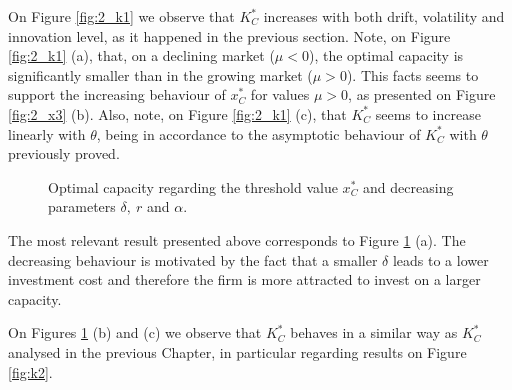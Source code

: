 On Figure \ref{fig:2_k1} we observe that $K^*_C$ increases with both drift, volatility and innovation level, as it happened in the previous section. 
Note, on Figure \ref{fig:2_k1} (a), that, on a declining market ($\mu<0$), the optimal capacity is significantly smaller than in the growing market ($\mu>0$). This facts seems to support the increasing behaviour of $x^*_C$ for values $\mu>0$, as presented on Figure \ref{fig:2_x3} (b).
Also, note, on Figure \ref{fig:2_k1} (c), that $K^*_C$ seems to increase linearly with $\theta$, being in accordance to the asymptotic behaviour of $K_C^*$ with $\theta$ previously proved.

\begin{figure}[!htb]
	\begin{subfigmatrix}{3}
	\end{subfigmatrix}
	\caption{Optimal capacity regarding the threshold value $x^*_C$ and decreasing parameters $\delta, \ r$ and $\alpha$.}
	\label{fig:2_k3}
\end{figure}

The most relevant result presented above corresponds to Figure \ref{fig:2_k3} (a). The decreasing behaviour is motivated by the fact that a smaller $\delta$ leads to a lower investment cost and therefore the firm is more attracted to invest on a larger capacity.

On Figures \ref{fig:2_k3} (b) and (c) we observe that $K^*_C$ behaves in a similar way as $K^*_C$ analysed in the previous Chapter, in particular regarding results on Figure \ref{fig:k2}.



